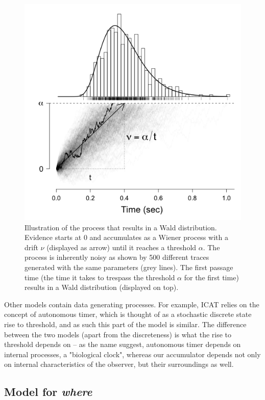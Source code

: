\documentclass{article}
\begin{document}
\begin{figure}
    \centering
    \includegraphics[width=\linewidth]{figures/wald_distribution.png}
    \caption{Illustration of the process that results in a Wald distribution. Evidence starts at 0 and accumulates as a Wiener process with a drift $\nu$ (displayed as arrow) until it reaches a threshold $\alpha$. The process is inherently noisy as shown by 500 different traces generated with the same parameters (grey lines). The first passage time (the time it takes to trespass the threshold $\alpha$ for the first time) results in a Wald distribution (displayed on top).}
    \label{fig:wald_distribution}
\end{figure}

Other models contain data generating processes. For example, ICAT \citep{trukenbrod2014icat} relies on the concept of autonomous timer, which is thought of as a stochastic discrete state rise to threshold, and as such this part of the model is similar. The difference between the two models (apart from the discreteness) is what the rise to threshold depends on -- as the name suggest, autonomous timer depends on internal processes, a "biological clock", whereas our accumulator depends not only on internal characteristics of the observer, but their surroundings as well.

\subsection{Model for \textit{where}}
\end{document}
